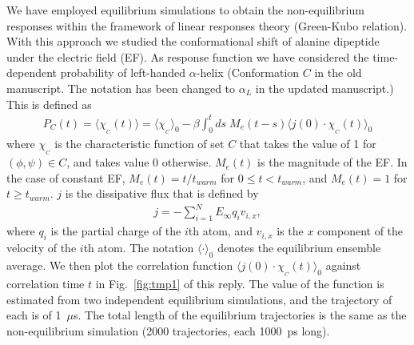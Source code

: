 \documentclass[]{revtex4-1}
\begin{document}
We have employed equilibrium simulations to obtain the non-equilibrium
responses within the framework of linear responses theory (Green-Kubo relation).
With this approach we studied the conformational shift of alanine dipeptide under the electric field
(EF). As response function we have considered the time-dependent probability of
left-handed $\alpha$-helix (Conformation $C$ in the old manuscript. The notation has been changed to $\alpha_L$ in the updated manuscript.) This is defined as
\begin{align}\label{eqn:tmp1}
  P_C(t) = \langle\chi_{_C}(t)\rangle = \langle \chi_{_C} \rangle_0 -
  \beta \int_0^t ds\; M_e(t - s)\langle j(0)\cdot \chi_{_C}(t) \rangle_0
\end{align}
where $\chi_{_C}$ is the characteristic function of set $C$ that takes
the value of 1 for $(\phi,\psi)\in C$, and takes value 0
otherwise. $M_e(t)$ is the magnitude of the EF. In the case of
constant EF, $M_e(t) = t/t_{warm}$ for $0\leq t<t_{warm}$, and
$M_e(t) = 1$ for $t\geq t_{warm}$.
$j$ is the dissipative flux that is defined by
\begin{align}
  j = - \sum_{i=1}^N E_\infty q_i v_{i,x},
\end{align}
where $q_i$ is the partial charge of the $i$th atom, and $v_{i,x}$ is
the $x$ component of the velocity of the $i$th atom.  The notation
$\langle\cdot\rangle_0$ denotes the equilibrium ensemble average.
 We then plot the correlation function
$\langle j(0)\cdot \chi_{_C}(t) \rangle_0$ against correlation time $t$
in Fig.~\ref{fig:tmp1} of this reply. The value of the function is estimated from
two independent equilibrium simulations, and the trajectory of each is
of 1~$\mu$s. The total length of the equilibrium
trajectories is the same as the non-equilibrium simulation (2000
trajectories, each 1000~ps long).
\end{document}
